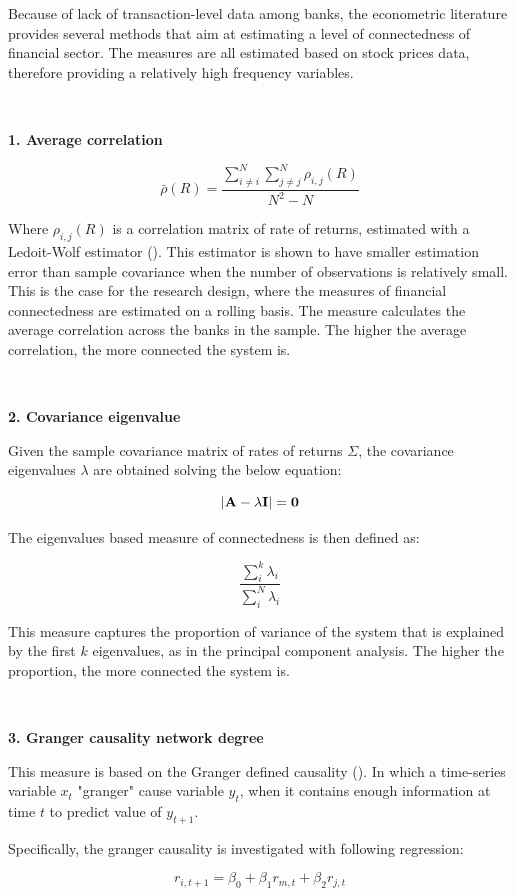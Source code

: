\documentclass{article}
\begin{document}
Because of lack of transaction-level data among banks, the econometric literature provides several methods that aim at estimating a level of connectedness of financial sector. The measures are all estimated based on stock prices data, therefore providing a relatively high frequency variables. 

\

\textbf{1. Average correlation} 

\[\bar{\rho}(R) = \frac{\sum_{i \neq i}^{N} \sum_{j \neq j}^{N} \rho_{i,j}(R)}{N^2-N}\]

Where $\rho_{i,j}(R)$ is a correlation matrix of rate of returns, estimated with a Ledoit-Wolf estimator (\citet{ledoit}). This estimator is shown to have smaller estimation error than sample covariance when the number of observations is relatively small. This is the case for the research design, where the measures of financial connectedness are estimated on a rolling basis. The measure calculates the average correlation across the banks in the sample. The higher the average correlation, the more connected the system is.

\

\textbf{2. Covariance eigenvalue }

Given the sample covariance matrix of rates of returns $\Sigma$, the covariance eigenvalues $\lambda$ are obtained solving the below equation:

\[|\bf{A} - \lambda \bf{I}| = 0\]

The eigenvalues based measure of connectedness is then defined as:

\[\frac{\sum_{i}^{k} \lambda_i}{\sum_{i}^{N} \lambda_i}\]

This measure captures the proportion of variance of the system that is explained by the first $k$ eigenvalues, as in the principal component analysis. The higher the proportion, the more connected the system is.

\

\textbf{3. Granger causality network degree}

This measure is based on the Granger defined causality (\citet{granger}). In which a time-series variable $x_t$ "granger" cause variable $y_t$, when it contains enough information at time $t$ to predict value of $y_{t+1}$. 

Specifically, the granger causality is investigated with following regression:

\[r_{i,t+1} = \beta_0 + \beta_1 r_{m, t} + \beta_2 r_{j, t}\]
\end{document}
